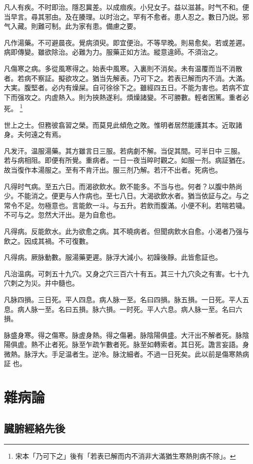 凡人有疾。不时即治。隱忍冀差。以成痼疾。小兒女子。益以滋甚。时气不和。便当早言。尋其邪由。及在腠理。以时治之。罕有不愈者。患人忍之。數日乃説。邪气入藏。則難可制。此为家有患。備慮之要。

凡作湯藥。不可避晨夜。覺病須臾。即宜便治。不等早晚。則易愈矣。若或差遲。病即傳變。雖欲除治。必難为力。服藥正如方法。縱意違師。不須治之。

凡傷寒之病。多從風寒得之。始表中風寒。入裏則不消矣。未有温覆而当不消散者。若病不察証。擬欲攻之。猶当先解表。乃可下之。若表已解而内不消。大滿。大実。腹堅者。必内有燥屎。自可徐徐下之。雖經四五日。不能为害也。若病不宜下而强攻之。内虗熱入。{\khaaitp 則为}挾熱遂利。煩燥諸變。不可勝數。輕者困篤。重者必死。
	\footnote{宋本「乃可下之」後有「若表已解而内不消非大滿猶生寒熱則病不除」。}

世上之士。但務彼翕習之榮。而莫見此傾危之敗。惟明者居然能護其本。近取諸身。夫何遠之有焉。

凡发汗。温服湯藥。其方雖言日三服。若病劇不解。当促其間。可半日中{\sungtpii 𥁞}三服。若与病相阻。即便有所覺。重病者。一日一夜当晬时觀之。如服一剂。病証猶在。故当復作本湯服之。至有不肯汗出。服三剂乃解。若汗不出者。死病也。

凡得时气病。至五六日。而渴欲飲水。飲不能多。不当与也。何者？以腹中熱尚少。不能消之。便更与人作病也。至七八日。大渴欲飲水者。猶当依証与之。与之常令不足。勿極意也。言能飲一斗。与五升。若飲而腹滿。小便不利。若喘若噦。不可与之。忽然大汗出。是为自愈也。

凡得病。反能飲水。此为欲愈之病。其不曉病者。但聞病飲水自愈。小渴者乃强与飲之。因成其禍。不可復數。

凡得病。厥脉動數。服湯藥更遲。脉浮大減小。初躁後靜。此皆愈証也。

凡治温病。可刺五十九穴。又身之穴三百六十有五。其三十九穴灸之有害。七十九穴刺之为災。并中髓也。

凡脉四損。三日死。平人四息。病人脉一至。名曰四損。脉五損。一日死。平人五息。病人脉一至。名曰五損。脉六損。一时死。平人六息。病人脉一至。名曰六損。

脉盛身寒。得之傷寒。脉虗身熱。得之傷暑。脉陰陽俱盛。大汗出不解者死。脉陰陽俱虗。熱不止者死。脉至乍疏乍數者死。脉至如轉索者。其日死。譫言妄語。身微熱。脉浮大。手足温者生。逆冷。脉沈細者。不過一日死矣。此以前是傷寒熱病証{\sungtpii 𠊱}也。

\part{雜病論}

\chapter{臓腑經絡先後}


